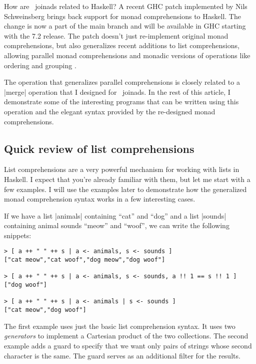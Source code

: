 \documentclass{tmr}
\begin{document}
How are \fsharp \ joinads related to Haskell? A recent GHC patch implemented by Nils Schweinsberg 
\cite{bringbackmc, comprefun} brings back support for monad comprehensions to Haskell. 
The change is now a part of the main branch and will be available in GHC starting with the 7.2 release.
The patch doesn't just re-implement original monad comprehensions, but also generalizes recent 
additions to list comprehensions, allowing parallel monad comprehensions and monadic 
versions of operations like ordering and grouping \cite{groupordercompre}. 

The operation that generalizes parallel comprehensions is closely related to a |merge| operation 
that I designed for \fsharp \ joinads. In the rest of this article, I demonstrate some of the 
interesting programs that can be written using this operation and the elegant syntax provided by 
the re-designed monad comprehensions. 


\subsection{Quick review of list comprehensions}
List comprehensions are a very powerful mechanism for working with lists in Haskell. I expect that 
you're already familiar with them, but let me start with a few examples. I will use the examples 
later to demonstrate how the generalized monad comprehension syntax works in a few interesting cases.

If we have a list |animals| containing ``cat'' and ``dog'' and a list |sounds| containing 
animal sounds ``meow'' and ``woof'', we can write the following snippets:

\begin{verbatim}
> [ a ++ " " ++ s | a <- animals, s <- sounds ]
["cat meow","cat woof","dog meow","dog woof"]

> [ a ++ " " ++ s | a <- animals, s <- sounds, a !! 1 == s !! 1 ]
["dog woof"]

> [ a ++ " " ++ s | a <- animals | s <- sounds ]
["cat meow","dog woof"]
\end{verbatim}
The first example uses just the basic list comprehension syntax. It uses two \textit{generators}
to implement a Cartesian product of the two collections. The second example adds a guard to specify that we
want only pairs of strings whose second character is the same. The guard serves as an additional
filter for the results.
\end{document}
